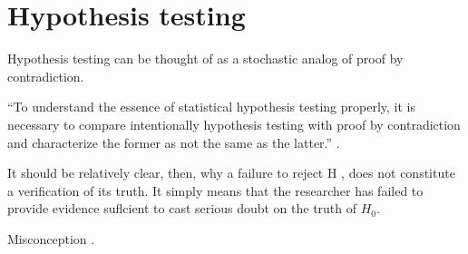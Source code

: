 \hypertarget{ch:hypothesis}{%
\chapter{Hypothesis testing}\label{ch:hypothesis}}

Hypothesis testing can be thought of as a stochastic analog of proof by
contradiction.

``To understand the essence of statistical hypothesis testing properly, it is
necessary to compare intentionally hypothesis testing with proof by
contradiction and characterize the former as not the same as the latter.''
\citep{otani2019comparing}.

It should be relatively clear, then, why a failure to reject H , does not
constitute a verification of its truth. It simply means that the researcher has
failed to provide evidence suflcient to cast serious doubt on the truth of
\(H_0\). \citep{reeves1980hypothesis}

Misconception \citep{falk1995significance}.
